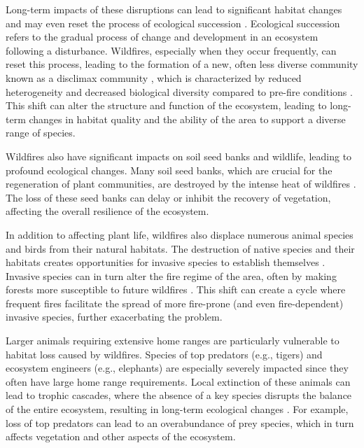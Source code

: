 \documentclass[
  12 pt,
]{Nemilov}
\begin{document}
Long-term impacts of these disruptions can lead to significant habitat changes and may even reset the process of ecological succession \citep{Dawe2021InitialSA}. Ecological succession refers to the gradual process of change and development in an ecosystem following a disturbance. Wildfires, especially when they occur frequently, can reset this process, leading to the formation of a new, often less diverse community known as a disclimax community \citep{awadhiya2021principles}, which is characterized by reduced heterogeneity and decreased biological diversity compared to pre-fire conditions \citep{zhang2021habitat, pastro2011burning}. This shift can alter the structure and function of the ecosystem, leading to long-term changes in habitat quality and the ability of the area to support a diverse range of species.

Wildfires also have significant impacts on soil seed banks and wildlife, leading to profound ecological changes. Many soil seed banks, which are crucial for the regeneration of plant communities, are destroyed by the intense heat of wildfires \citep{maia2012wildfire}. The loss of these seed banks can delay or inhibit the recovery of vegetation, affecting the overall resilience of the ecosystem.

In addition to affecting plant life, wildfires also displace numerous animal species and birds from their natural habitats. The destruction of native species and their habitats creates opportunities for invasive species to establish themselves \citep{rew2010reviewing}. Invasive species can in turn alter the fire regime of the area, often by making forests more susceptible to future wildfires \citep{faccenda2022screening}. This shift can create a cycle where frequent fires facilitate the spread of more fire-prone (and even fire-dependent) invasive species, further exacerbating the problem.

Larger animals requiring extensive home ranges are particularly vulnerable to habitat loss caused by wildfires. Species of top predators (e.g., tigers) and ecosystem engineers (e.g., elephants) are especially severely impacted since they often have large home range requirements. Local extinction of these animals can lead to trophic cascades, where the absence of a key species disrupts the balance of the entire ecosystem, resulting in long-term ecological changes \citep{awadhiya2021principles, banks2011starting}. For example, loss of top predators can lead to an overabundance of prey species, which in turn affects vegetation and other aspects of the ecosystem.
\end{document}
